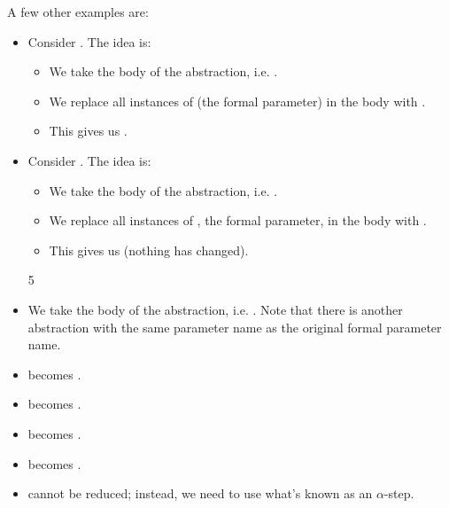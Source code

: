 \documentclass[letterpaper]{article}
\begin{document}
A few other examples are: 
\begin{itemize}
    \item Consider . The idea is: 
    \begin{itemize}
        \item We take the body of the abstraction, i.e. .
        \item We replace all instances of  (the formal parameter) in the body with .
        \item This gives us .
    \end{itemize}

    \item Consider . The idea is: 
    \begin{itemize}
        \item We take the body of the abstraction, i.e. .
        \item We replace all instances of , the formal parameter, in the body with .
        \item This gives us  (nothing has changed).  
    \end{itemize}

5        \item We take the body of the abstraction, i.e. . Note that there is another abstraction with the same parameter name as the original formal parameter name. 

    \item {} becomes .
    \item {} becomes .
    \item {} becomes .
    \item {} becomes .
    \item {} cannot be reduced; instead, we need to use what's known as an $\alpha$-step. 
\end{itemize}
\end{document}
